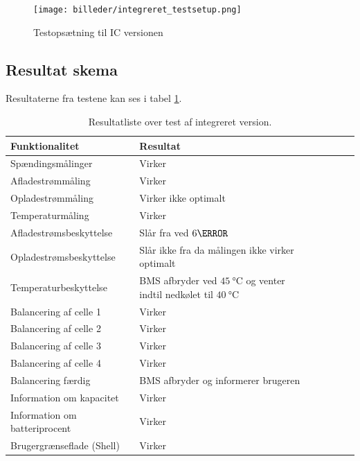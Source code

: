 \begin{figure}[h]
	\centering
	\texttt{[image: billeder/integreret\_testsetup.png]}
	\caption{Testopsætning til IC versionen}
	\label{fig:ic_testsetup}
\end{figure}

\subsection{Resultat skema}
Resultaterne fra testene kan ses i tabel \ref{tab:resultat_IC}.

\begin{table}[h!]
	\small
	\centering
	\begin{threeparttable}
		\begin{tabular}{ l l l l l l l }
			\toprule
			\multicolumn{1}{l}{\textbf{Funktionalitet}}          &
			\multicolumn{1}{l}{\textbf{Resultat}}           \\
			\hline
			Spændingsmålinger              & Virker                         \\
			Afladestrømmåling                    		& Virker                         \\
			Opladestrømmåling                    		& Virker ikke optimalt                         \\
			Temperaturmåling                    		& Virker                       \\
			Afladestrømsbeskyttelse		& Slår fra ved $6\ampere$        \\
			Opladestrømsbeskyttelse   	& Slår ikke fra da målingen ikke virker optimalt      \\
			Temperaturbeskyttelse          & BMS afbryder ved $\SI{45}{\celsius}$ og venter indtil nedkølet til $\SI{40}{\celsius}$           \\
			Balancering af celle 1         & Virker                         \\
			Balancering af celle 2        & Virker                         \\
			Balancering af celle 3        & Virker                         \\			
			Balancering af celle 4        & Virker                         \\
			Balancering færdig             & BMS afbryder og informerer brugeren                  \\
			Information om kapacitet       & Virker                          \\
			Information om batteriprocent 							& Virker			 \\
			Brugergrænseflade (Shell)                       & Virker                    \\
			
			\bottomrule
		\end{tabular}
		\caption{Resultatliste over test af integreret version.}
		\label{tab:resultat_IC}
	\end{threeparttable}
\end{table} 
\FloatBlock

